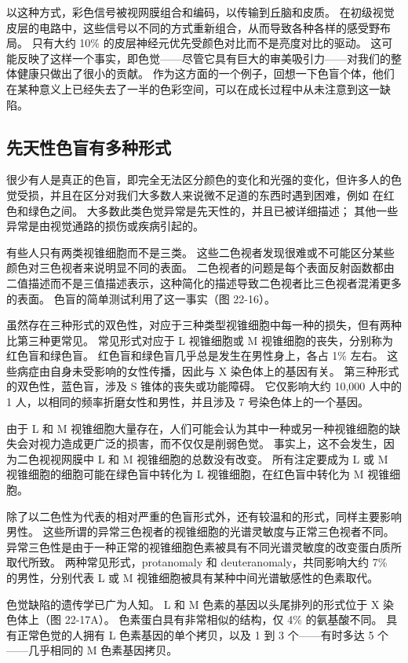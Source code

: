 以这种方式，彩色信号被视网膜组合和编码，以传输到丘脑和皮质。 
在初级视觉皮层的电路中，这些信号以不同的方式重新组合，从而导致各种各样的感受野布局。 
只有大约 10\% 的皮层神经元优先受颜色对比而不是亮度对比的驱动。 
这可能反映了这样一个事实，即色觉——尽管它具有巨大的审美吸引力——对我们的整体健康只做出了很小的贡献。 
作为这方面的一个例子，回想一下色盲个体，他们在某种意义上已经失去了一半的色彩空间，可以在成长过程中从未注意到这一缺陷。


\subsection{先天性色盲有多种形式}
很少有人是真正的色盲，即完全无法区分颜色的变化和光强的变化，但许多人的色觉受损，并且在区分对我们大多数人来说微不足道的东西时遇到困难，例如 在红色和绿色之间。 大多数此类色觉异常是先天性的，并且已被详细描述； 其他一些异常是由视觉通路的损伤或疾病引起的。

有些人只有两类视锥细胞而不是三类。 这些二色视者发现很难或不可能区分某些颜色对三色视者来说明显不同的表面。 二色视者的问题是每个表面反射函数都由二值描述而不是三值描述表示，这种简化的描述导致二色视者比三色视者混淆更多的表面。 色盲的简单测试利用了这一事实（图 22-16）。

虽然存在三种形式的双色性，对应于三种类型视锥细胞中每一种的损失，但有两种比第三种更常见。 常见形式对应于 L 视锥细胞或 M 视锥细胞的丧失，分别称为红色盲和绿色盲。 红色盲和绿色盲几乎总是发生在男性身上，各占 1\% 左右。 这些病症由自身未受影响的女性传播，因此与 X 染色体上的基因有关。 第三种形式的双色性，蓝色盲，涉及 S 锥体的丧失或功能障碍。 它仅影响大约 10,000 人中的 1 人，以相同的频率折磨女性和男性，并且涉及 7 号染色体上的一个基因。

由于 L 和 M 视锥细胞大量存在，人们可能会认为其中一种或另一种视锥细胞的缺失会对视力造成更广泛的损害，而不仅仅是削弱色觉。 事实上，这不会发生，因为二色视视网膜中 L 和 M 视锥细胞的总数没有改变。 所有注定要成为 L 或 M 视锥细胞的细胞可能在绿色盲中转化为 L 视锥细胞，在红色盲中转化为 M 视锥细胞。

除了以二色性为代表的相对严重的色盲形式外，还有较温和的形式，同样主要影响男性。 这些所谓的异常三色视者的视锥细胞的光谱灵敏度与正常三色视者不同。 异常三色性是由于一种正常的视锥细胞色素被具有不同光谱灵敏度的改变蛋白质所取代所致。 两种常见形式，protanomaly 和 deuteranomaly，共同影响大约 7\% 的男性，分别代表 L 或 M 视锥细胞被具有某种中间光谱敏感性的色素取代。

色觉缺陷的遗传学已广为人知。 L 和 M 色素的基因以头尾排列的形式位于 X 染色体上（图 22-17A）。 色素蛋白具有非常相似的结构，仅 4\% 的氨基酸不同。 具有正常色觉的人拥有 L 色素基因的单个拷贝，以及 1 到 3 个——有时多达 5 个——几乎相同的 M 色素基因拷贝。

